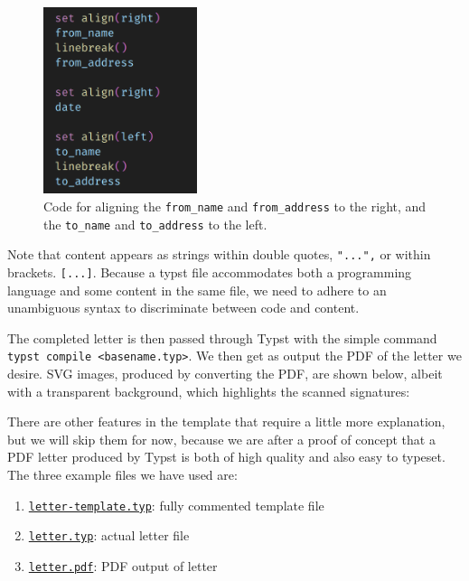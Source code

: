 \documentclass[
  a4paper,
]{article}
\begin{document}
\begin{figure}
\hypertarget{fig:align}{%
\centering
\includegraphics[width=0.4\textwidth,height=\textheight]{images/align-right-left.png}
\caption{Code for aligning the \texttt{from\_name} and
\texttt{from\_address} to the right, and the \texttt{to\_name} and
\texttt{to\_address} to the left.}\label{fig:align}
}
\end{figure}

Note that content appears as strings within double quotes,
\texttt{"...",} or within brackets. \texttt{{[}...{]}}. Because a typst
file accommodates both a programming language and some content in the
same file, we need to adhere to an unambiguous syntax to discriminate
between code and content.

The completed letter is then passed through Typst with the simple
command \texttt{typst\ compile\ \textless{}basename.typ\textgreater{}}.
We then get as output the PDF of the letter we desire. SVG images,
produced by converting the PDF, are shown below, albeit with a
transparent background, which highlights the scanned signatures:

\begin{center}




\end{center}

There are other features in the template that require a little more
explanation, but we will skip them for now, because we are after a proof
of concept that a PDF letter produced by Typst is both of high quality
and also easy to typeset. The three example files we have used are:

\begin{enumerate}
\item
  \href{auxiliary/letter-template.typ}{\texttt{letter-template.typ}}:
  fully commented template file
\item
  \href{auxiliary/letter.typ}{\texttt{letter.typ}}: actual letter file
\item
  \href{auxiliary/letter.pdf}{\texttt{letter.pdf}}: PDF output of letter
\end{enumerate}
\end{document}
